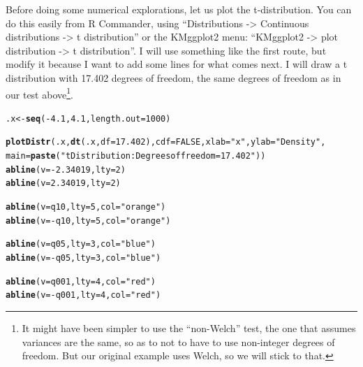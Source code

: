 \documentclass[a4paper,11pt]{article}\usepackage[]{graphicx}\usepackage[]{xcolor}
\makeatletter
\newcommand{\hlnum}[1]{\textcolor[rgb]{0.686,0.059,0.569}{#1}}%
\newcommand{\hlsng}[1]{\textcolor[rgb]{0.192,0.494,0.8}{#1}}%
\newcommand{\hlopt}[1]{\textcolor[rgb]{0,0,0}{#1}}%
\newcommand{\hldef}[1]{\textcolor[rgb]{0.345,0.345,0.345}{#1}}%
\newcommand{\hlkwb}[1]{\textcolor[rgb]{0.69,0.353,0.396}{#1}}%
\newcommand{\hlkwc}[1]{\textcolor[rgb]{0.333,0.667,0.333}{#1}}%
\newcommand{\hlkwd}[1]{\textcolor[rgb]{0.737,0.353,0.396}{\textbf{#1}}}%
\newenvironment{kframe}{%
 \def\at@end@of@kframe{}%
 \ifinner\ifhmode%
  \def\at@end@of@kframe{\end{minipage}}%
  \begin{minipage}{\columnwidth}%
 \fi\fi%
 \def\FrameCommand##1{\hskip\@totalleftmargin \hskip-\fboxsep
 \colorbox{shadecolor}{##1}\hskip-\fboxsep
     \hskip-\linewidth \hskip-\@totalleftmargin \hskip\columnwidth}%
 \MakeFramed {\advance\hsize-\width
   \@totalleftmargin\z@ \linewidth\hsize
   \@setminipage}}%
 {\par\unskip\endMakeFramed%
 \at@end@of@kframe}
\newenvironment{knitrout}{}{} %
\numberwithin{exercise}{section}
\makeatother
\begin{document}
Before doing some numerical explorations, let us plot the t-distribution. You can do this easily from R Commander, using ``Distributions -> Continuous distributions -> t distribution'' or the KMggplot2 menu: ``KMggplot2 -> plot distribution -> t distribution''. I will use something like the first route, but modify it because I want to add some lines for what comes next. I will draw a t distribution with 17.402 degrees of freedom, the same degrees of freedom as in our test above\footnote{It might have been simpler to use the ``non-Welch'' test, the one that assumes variances are the same, so as to not to have to use non-integer degrees of freedom. But our original example uses Welch, so we will stick to that.}.






\begin{knitrout}
\color{fgcolor}\begin{kframe}
\begin{alltt}
\hldef{.x} \hlkwb{<-} \hlkwd{seq}\hldef{(}\hlopt{-}\hlnum{4.1}\hldef{,} \hlnum{4.1}\hldef{,} \hlkwc{length.out}\hldef{=}\hlnum{1000}\hldef{)}

\hlkwd{plotDistr}\hldef{(.x,} \hlkwd{dt}\hldef{(.x,} \hlkwc{df}\hldef{=}\hlnum{17.402}\hldef{),} \hlkwc{cdf}\hldef{=}\hlnum{FALSE}\hldef{,} \hlkwc{xlab}\hldef{=}\hlsng{"x"}\hldef{,} \hlkwc{ylab}\hldef{=}\hlsng{"Density"}\hldef{,}
          \hlkwc{main}\hldef{=}\hlkwd{paste}\hldef{(}\hlsng{"t Distribution:  Degrees of freedom=17.402"}\hldef{))}
\hlkwd{abline}\hldef{(}\hlkwc{v} \hldef{=} \hlopt{-}\hlnum{2.34019}\hldef{,} \hlkwc{lty} \hldef{=} \hlnum{2}\hldef{)}
\hlkwd{abline}\hldef{(}\hlkwc{v} \hldef{=} \hlnum{2.34019}\hldef{,} \hlkwc{lty} \hldef{=} \hlnum{2}\hldef{)}

\hlkwd{abline}\hldef{(}\hlkwc{v} \hldef{= q10,} \hlkwc{lty} \hldef{=} \hlnum{5}\hldef{,} \hlkwc{col} \hldef{=} \hlsng{"orange"}\hldef{)}
\hlkwd{abline}\hldef{(}\hlkwc{v} \hldef{=} \hlopt{-}\hldef{q10,} \hlkwc{lty} \hldef{=} \hlnum{5}\hldef{,} \hlkwc{col} \hldef{=} \hlsng{"orange"}\hldef{)}


\hlkwd{abline}\hldef{(}\hlkwc{v} \hldef{= q05,} \hlkwc{lty} \hldef{=} \hlnum{3}\hldef{,} \hlkwc{col} \hldef{=} \hlsng{"blue"}\hldef{)}
\hlkwd{abline}\hldef{(}\hlkwc{v} \hldef{=} \hlopt{-}\hldef{q05,} \hlkwc{lty} \hldef{=} \hlnum{3}\hldef{,} \hlkwc{col} \hldef{=} \hlsng{"blue"}\hldef{)}

\hlkwd{abline}\hldef{(}\hlkwc{v} \hldef{= q001,} \hlkwc{lty} \hldef{=} \hlnum{4}\hldef{,} \hlkwc{col} \hldef{=} \hlsng{"red"}\hldef{)}
\hlkwd{abline}\hldef{(}\hlkwc{v} \hldef{=} \hlopt{-}\hldef{q001,} \hlkwc{lty} \hldef{=} \hlnum{4}\hldef{,} \hlkwc{col} \hldef{=} \hlsng{"red"}\hldef{)}


\end{alltt}
\end{kframe}
\end{knitrout}
\end{document}
